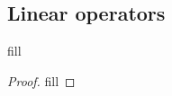 \subsection{Linear operators}

\begin{exercise}{1}
fill
\end{exercise}
\begin{proof}
fill
\end{proof}